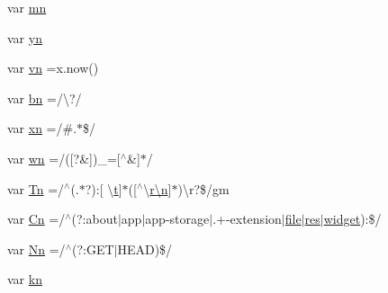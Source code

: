 \begin{DoxyCompactItemize}
\item 
var \hyperlink{jquery-1_8x_8min_8js_a227fb8e4dbaed5a772526c7e9bb0795f}{mn}
\item 
var \hyperlink{jquery-1_8x_8min_8js_a390d7ca752a48e31e8ffb5209c0a4cd6}{yn}
\item 
var \hyperlink{jquery-1_8x_8min_8js_a4d3ea42bab8c1a36105c29b5a098a050}{vn} =x.\+now()
\item 
var \hyperlink{jquery-1_8x_8min_8js_ac1a6899002e156376de301d5f5fa36d8}{bn} =/\textbackslash{}?/
\item 
var \hyperlink{jquery-1_8x_8min_8js_a5d600963c6441f15f548bc0b847b6a04}{xn} =/\#.$\ast$\$/
\item 
var \hyperlink{jquery-1_8x_8min_8js_aaa87ec69cc4d144180280e906cac73f1}{wn} =/(\mbox{[}?\&\mbox{]})\+\_\+=\mbox{[}$^\wedge$\&\mbox{]}$\ast$/
\item 
var \hyperlink{jquery-1_8x_8min_8js_a2a743fa90b7bc233019c5b720ccde5cc}{Tn} =/$^\wedge$(.$\ast$?)\+:\mbox{[} \textbackslash{}\hyperlink{jquery_8min_8js_aaccc9105df5383111407fd5b41255e23}{t}\mbox{]}$\ast$(\mbox{[}$^\wedge$\textbackslash{}\hyperlink{jquery-1_8x_8min_8js_afc984c4f6c68ce30a0af99006f5f8d27}{r\textbackslash{}n}\mbox{]}$\ast$)\textbackslash{}r?\$/gm
\item 
var \hyperlink{jquery-1_8x_8min_8js_ab832fcb3f80f807f0b65d1e3b4904de8}{Cn} =/$^\wedge$(?\+:about$\vert$app$\vert$app-\/storage$\vert$.+-\/extension$\vert$\hyperlink{classfile}{file}$\vert$\hyperlink{image__gallery_2tpl_2popup_8js_a9559c70bbf95d1f018e5799d4c4067a2}{res}$\vert$\hyperlink{classwidget}{widget})\+:\$/
\item 
var \hyperlink{jquery-1_8x_8min_8js_a03586bb881647685652f72d98d189ed0}{Nn} =/$^\wedge$(?\+:G\+ET$\vert$H\+E\+AD)\$/
\item 
var \hyperlink{jquery-1_8x_8min_8js_a23f32ac4dde4f478204787582eab7830}{kn}
\item 

\end{DoxyCompactItemize}
